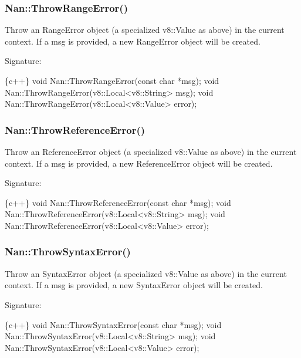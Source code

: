 \label{_api_nan_throw_range_error}%
 \subsubsection*{Nan\+::\+Throw\+Range\+Error()}

Throw an Range\+Error object (a specialized {\ttfamily v8\+::\+Value} as above) in the current context. If a {\ttfamily msg} is provided, a new Range\+Error object will be created.

Signature\+:


\begin{DoxyCode}
\{c++\}
void Nan::ThrowRangeError(const char *msg);
void Nan::ThrowRangeError(v8::Local<v8::String> msg);
void Nan::ThrowRangeError(v8::Local<v8::Value> error);
\end{DoxyCode}


\label{_api_nan_throw_reference_error}%
 \subsubsection*{Nan\+::\+Throw\+Reference\+Error()}

Throw an Reference\+Error object (a specialized {\ttfamily v8\+::\+Value} as above) in the current context. If a {\ttfamily msg} is provided, a new Reference\+Error object will be created.

Signature\+:


\begin{DoxyCode}
\{c++\}
void Nan::ThrowReferenceError(const char *msg);
void Nan::ThrowReferenceError(v8::Local<v8::String> msg);
void Nan::ThrowReferenceError(v8::Local<v8::Value> error);
\end{DoxyCode}


\label{_api_nan_throw_syntax_error}%
 \subsubsection*{Nan\+::\+Throw\+Syntax\+Error()}

Throw an Syntax\+Error object (a specialized {\ttfamily v8\+::\+Value} as above) in the current context. If a {\ttfamily msg} is provided, a new Syntax\+Error object will be created.

Signature\+:


\begin{DoxyCode}
\{c++\}
void Nan::ThrowSyntaxError(const char *msg);
void Nan::ThrowSyntaxError(v8::Local<v8::String> msg);
void Nan::ThrowSyntaxError(v8::Local<v8::Value> error);
\end{DoxyCode}


